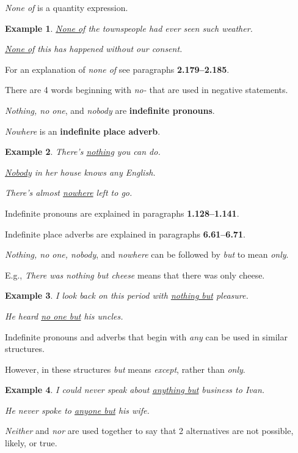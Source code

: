\documentclass[oneside]{book}
\numberwithin{equation}{section}
\newtheorem{example}{Example}[section]
\begin{document}
%
\noindent{} \textit{None of} is a quantity expression.
\begin{example}
    \underline{None of} the townspeople had ever seen such weather.
    
    \underline{None of} this has happened without our consent.
\end{example}
For an explanation of \textit{none of} see paragraphs \textbf{2.179--2.185}.

%
\noindent{} There are 4 words beginning with \textit{no-} that are used in negative statements.

\textit{Nothing, no one}, and \textit{nobody} are \textbf{indefinite pronouns}.

\textit{Nowhere} is an \textbf{indefinite place adverb}.
\begin{example}
    There's \underline{nothing} you can do.
    
    \underline{Nobody} in her house knows any English.
    
    There's almost \underline{nowhere} left to go.
\end{example}
Indefinite pronouns are explained in paragraphs \textbf{1.128--1.141}.

%
Indefinite place adverbs are explained in paragraphs \textbf{6.61--6.71}.

%
\noindent{} \textit{Nothing, no one, nobody}, and \textit{nowhere} can be followed by \textit{but} to mean \textit{only}.

E.g., \textit{There was nothing but cheese} means that there was only cheese.
\begin{example}
    I look back on this period with \underline{nothing but} pleasure.
    
    He heard \underline{no one but} his uncles.
\end{example}
Indefinite pronouns and adverbs that begin with \textit{any} can be used in similar structures.

However, in these structures \textit{but} means \textit{except}, rather than \textit{only}.
\begin{example}
    I could never speak about \underline{anything but} business to Ivan.
    
    He never spoke to \underline{anyone but} his wife.
\end{example}
%
\noindent{} \textit{Neither} and \textit{nor} are used together to say that 2 alternatives are not possible, likely, or true.
\end{document}
